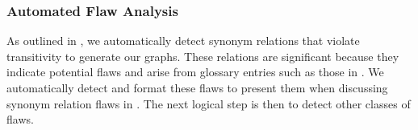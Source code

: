 
\subsubsection{Automated Flaw Analysis}\label{auto-flaw-analysis}

As outlined in , we automatically detect synonym relations
that violate transitivity to generate our graphs. These relations are
significant because they indicate potential flaws and arise from glossary
entries such as those in . We automatically detect
and format these flaws to present them when discussing synonym relation flaws
in . %
The next logical step is then to detect other classes of flaws.

\ExampleFlawGraphs{}

